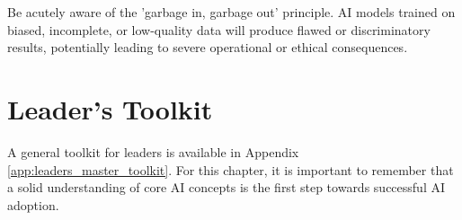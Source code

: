 \begin{warningbox}
Be acutely aware of the 'garbage in, garbage out' principle. AI models trained on biased, incomplete, or low-quality data will produce flawed or discriminatory results, potentially leading to severe operational or ethical consequences.
\end{warningbox}

\section{Leader's Toolkit}
\label{sec:core_ai_leaders_toolkit}

A general toolkit for leaders is available in Appendix \ref{app:leaders_master_toolkit}. For this chapter, it is important to remember that a solid understanding of core AI concepts is the first step towards successful AI adoption.
